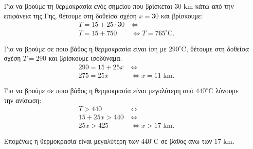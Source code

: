 
\begin{alist}
\item Για να βρούμε τη θερμοκρασία ενός σημείου που βρίσκεται $30 \text{ km}$ κάτω από την επιφάνεια της Γης, θέτουμε στη δοθείσα σχέση $x = 30$ και βρίσκουμε:
\begin{align*}
T = 15 + 25 \cdot 30 \ &\Leftrightarrow \\
T = 15 + 750 \ &\Leftrightarrow T = 765^\circ\text{C}.
\end{align*}

\item Για να βρούμε σε ποιο βάθος η θερμοκρασία είναι ίση με $290^\circ\text{C}$, θέτουμε στη δοθείσα σχέση $T = 290$ και βρίσκουμε ισοδύναμα:
\begin{align*}
290 = 15 + 25x \ &\Leftrightarrow \\
275 = 25x \ &\Leftrightarrow x = 11 \text{ km}.
\end{align*}

\item Για να βρούμε σε ποιο βάθος η θερμοκρασία είναι μεγαλύτερη από $440^\circ\text{C}$ λύνουμε την ανίσωση:
\begin{align*}
T > 440 \ &\Leftrightarrow \\
15 + 25x > 440 \ &\Leftrightarrow \\
25x > 425 \ &\Leftrightarrow x > 17 \text{ km}.
\end{align*}

Επομένως η θερμοκρασία είναι μεγαλύτερη των $440^\circ\text{C}$ σε βάθος άνω των $17 \text{ km}$.
\end{alist}

